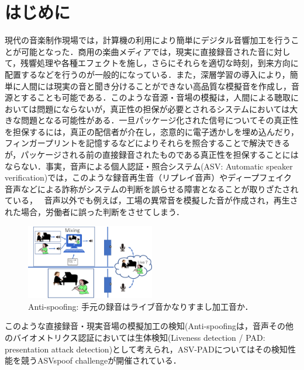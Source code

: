 \documentclass[technicalreport]{ieicej}
\begin{document}
\section{はじめに}
現代の音楽制作現場では，計算機の利用により簡単にデジタル音響加工を行うことが可能となった．商用の楽曲メディアでは，現実に直接録音された音に対して，残響処理や各種エフェクトを施し，さらにそれらを適切な時刻，到来方向に配置するなどを行うのが一般的になっている．また，深層学習の導入により，簡単に人間には現実の音と聞き分けることができない高品質な模擬音を作成し，音源とすることも可能である．このような音源・音場の模擬は，人間による聴取においては問題にならないが，真正性の担保が必要とされるシステムにおいては大きな問題となる可能性がある．一旦パッケージ化された信号についてその真正性を担保するには，真正の配信者が介在し，恣意的に電子透かしを埋め込んだり，フィンガープリントを記憶するなどによりそれらを照合することで解決できるが，パッケージされる前の直接録音されたものである真正性を担保することにはならない．事実，音声による個人認証・照合システム(ASV: Automatic speaker verification)では，このような録音再生音（リプレイ音声）やディープフェイク音声などによる詐称がシステムの判断を誤らせる障害となることが取りざたされている，　
音声以外でも例えば，工場の異常音を模擬した音が作成され，再生された場合，労働者に誤った判断をさせてしまう．

\begin{figure}[tb]
	\centering
	\includegraphics[width=0.5\textwidth]{fig/Anti-spoofing.png}
	\caption{Anti-spoofing: 手元の録音はライブ音かなりすまし加工音か．}
	\label{fig:Anti-Spoofing}
\end{figure}
%　　　　　　　　　　　　　　　　　　　　　　　　　　


このような直接録音・現実音場の模擬加工の検知(Anti-spoofingは，音声その他のバイオメトリクス認証においては生体検知(Liveness detection / PAD: presentation attack detection\cite{ISO/IEC30107-1:2016})として考えられ，ASV-PADについてはその検知性能を競うASVspoof challenge\cite{ASVspoof,ASVspoof2015,ASVspoof2017}が開催されている． 
\end{document}
